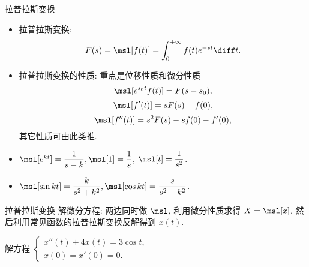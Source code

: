 \documentclass[aspectratio=169,handout]{ctexbeamer}
\begin{document}
\begin{frame}{拉普拉斯变换}
	\begin{itemize}
		\item 拉普拉斯变换:
		\[
			F(s)=\msl[f(t)]=\displaystyle\int_0^{+\infty}f(t)e^{-st}\diff t.
		\]
		\item 拉普拉斯变换的性质: 重点是位移性质和微分性质
		\[\msl[e^{s_0t}f(t)]=F(s-s_0),\]
		\[\msl[f'(t)]=sF(s)-f(0),\]
		\[\msl[f''(t)]=s^2F(s)-sf(0)-f'(0),\]
		其它性质可由此类推.
		\item $\msl[e^{kt}]=\dfrac1{s-k},\msl[1]=\dfrac1s$,
		$\msl[t]=\dfrac1{s^2}$.
		\item $\msl[\sin{kt}]=\dfrac k{s^2+k^2},\msl[\cos{kt}]=\dfrac s{s^2+k^2}$.
	\end{itemize}
\end{frame}


\begin{frame}{拉普拉斯变换}
	\onslide<+->
	解微分方程: 两边同时做 $\msl$, 利用微分性质求得 $X=\msl[x]$, 然后利用常见函数的拉普拉斯变换反解得到 $x(t)$.
	\onslide<+->
	\begin{exercise}
		解方程 
		$\begin{cases}
			x''(t)+4x(t)=3\cos t,& \\
			x(0)=x'(0)=0.&
		\end{cases}$
	\end{exercise}
\end{frame}
\end{document}
